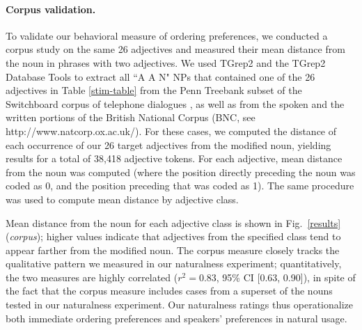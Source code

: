 \documentclass[12pt]{article}
\begin{document}
\paragraph{Corpus validation.} To validate our behavioral measure of ordering preferences, we conducted a corpus study on the same 26 adjectives and measured their mean distance from the noun in phrases with two adjectives. We used TGrep2 \citep{rohde2005} and the TGrep2 Database Tools \citep{Degen2011} to extract all ``A A N"  NPs that contained one of the 26 adjectives in Table \ref{stim-table} from the Penn Treebank subset of the Switchboard corpus of telephone dialogues \citep{godfrey1992}, as well as from the spoken and the written portions of the British National Corpus (BNC, see http://www.natcorp.ox.ac.uk/). For these cases, we computed the distance of each occurrence of our 26 target adjectives from the modified noun, yielding results for a total of 38,418 adjective tokens.  For each adjective, mean distance from the noun was computed (where the position directly preceding the noun was coded as 0, and the position preceding that was coded as 1). The same procedure was used to compute mean distance by adjective class.

Mean distance from the noun for each adjective class is shown in Fig.~\ref{results} (\emph{corpus}); higher values indicate that adjectives from the specified class tend to appear farther from the modified noun. The corpus measure closely tracks the qualitative pattern we measured in our naturalness experiment; quantitatively, the two measures are highly correlated ($r^{2}=0.83$, 95\% CI [0.63, 0.90]), in spite of the fact that the corpus measure includes cases from a superset of the nouns tested in our naturalness experiment. Our naturalness ratings thus operationalize both immediate ordering preferences and speakers' preferences in natural usage.
\end{document}
